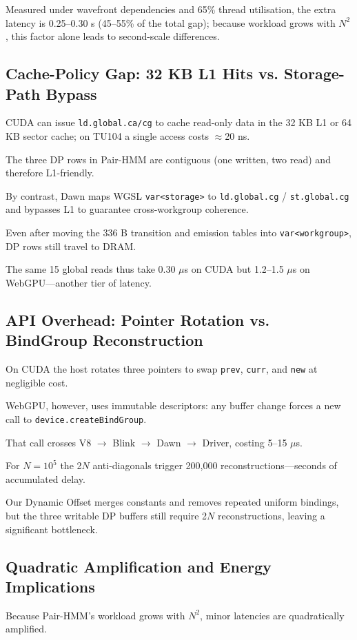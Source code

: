 \documentclass[12pt]{report}
\begin{document}
Measured under wavefront dependencies and 65\% thread utilisation, the extra latency is 0.25–0.30 s (45–55\% of the total gap); because workload grows with $N^2$, this factor alone leads to second-scale differences.

\subsection{Cache-Policy Gap: 32 KB L1 Hits vs. Storage-Path Bypass}
CUDA can issue \texttt{ld.global.ca/cg} to cache read-only data in the 32 KB L1 or 64 KB sector cache; on TU104 a single access costs $\approx$20 ns.

The three DP rows in Pair-HMM are contiguous (one written, two read) and therefore L1-friendly.

By contrast, Dawn maps WGSL \texttt{var<storage>} to \texttt{ld.global.cg} / \texttt{st.global.cg} and bypasses L1 to guarantee cross-workgroup coherence.

Even after moving the 336 B transition and emission tables into \texttt{var<workgroup>}, DP rows still travel to DRAM.

The same 15 global reads thus take 0.30 $\mu$s on CUDA but 1.2–1.5 $\mu$s on WebGPU—another tier of latency.

\subsection{API Overhead: Pointer Rotation vs. BindGroup Reconstruction}
On CUDA the host rotates three pointers to swap \texttt{prev}, \texttt{curr}, and \texttt{new} at negligible cost.

WebGPU, however, uses immutable descriptors: any buffer change forces a new call to \texttt{device.createBindGroup}.

That call crosses V8 $\rightarrow$ Blink $\rightarrow$ Dawn $\rightarrow$ Driver, costing 5–15 $\mu$s.

For $N=10^5$ the 2$N$ anti-diagonals trigger 200,000 reconstructions—seconds of accumulated delay.

Our Dynamic Offset merges constants and removes repeated uniform bindings, but the three writable DP buffers still require 2$N$ reconstructions, leaving a significant bottleneck.

\subsection{Quadratic Amplification and Energy Implications}
Because Pair-HMM’s workload grows with $N^2$, minor latencies are quadratically amplified.
\end{document}
